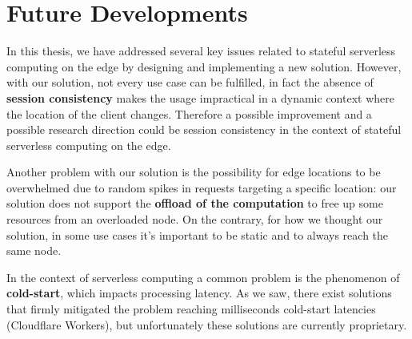 \section{Future Developments}
In this thesis, we have addressed several key issues related to stateful serverless computing on the edge by designing and implementing a new solution. However, with our solution, not every use case can be fulfilled, in fact the absence of \textbf{session consistency} makes the usage impractical in a dynamic context where the location of the client changes.
Therefore a possible improvement and a possible research direction could be session consistency in the context of stateful serverless computing on the edge.

Another problem with our solution is the possibility for edge locations to be overwhelmed due to random spikes in requests targeting a specific location: our solution does not support the \textbf{offload of the computation} to free up some resources from an overloaded node. On the contrary, for how we thought our solution, in some use cases it's important to be static and to always reach the same node. 

In the context of serverless computing a common problem is the phenomenon of \textbf{cold-start}, which impacts processing latency. As we saw, there exist solutions that firmly mitigated the problem reaching milliseconds cold-start latencies (Cloudflare Workers), but unfortunately these solutions are currently proprietary.
